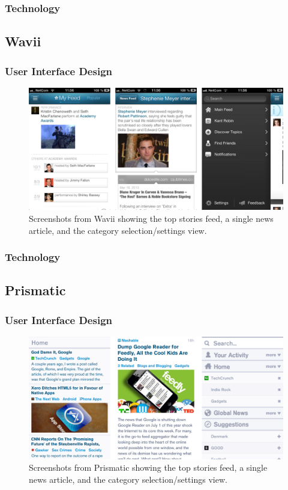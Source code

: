 \subsubsection{Technology}


\subsection{Wavii}

\subsubsection{User Interface Design}

\begin{figure}[!htbp]
\centering
\includegraphics[width=130mm]{GFX/screenshots/wavii.png}
\caption{Screenshots from Wavii showing the top stories feed, a single news article, and the category selection/settings view.}
\label{screenshots_wavii}
\end{figure}

\subsubsection{Technology}


\subsection{Prismatic}

\subsubsection{User Interface Design}

\begin{figure}[!htbp]
\centering
\includegraphics[width=130mm]{GFX/screenshots/prismatic.png}
\caption{Screenshots from Prismatic showing the top stories feed, a single news article, and the category selection/settings view.}
\label{screenshots_prismatic}
\end{figure}

